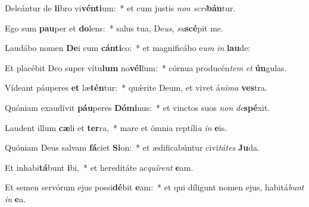 \item Deleántur de \textbf{li}bro vi\textbf{vén}\textbf{ti}um:~* et cum justis \textit{non} \textit{scri}\textbf{bán}tur.
\item Ego sum \textbf{pau}per et \textbf{do}lens:~* salus tua, De\textit{us}, \textit{su}\textbf{scé}pit me.
\item Laudábo nomen \textbf{De}i cum \textbf{cán}\textbf{ti}co:~* et magnificábo e\textit{um} \textit{in} \textbf{lau}de:
\item Et placébit Deo super vítu\textbf{lum} no\textbf{vél}lum:~* córnua producén\textit{tem} \textit{et} \textbf{ún}gulas.
\item Vídeant páuperes \textbf{et} læ\textbf{tén}tur:~* quǽrite Deum, et vivet á\textit{ni}\textit{ma} \textbf{ves}tra.
\item Quóniam exaudívit \textbf{páu}peres \textbf{Dó}\textbf{mi}nus:~* et vinctos suos \textit{non} \textit{de}\textbf{spé}xit.
\item Laudent illum \textbf{cæ}li et \textbf{ter}ra,~* mare et ómnia reptíli\textit{a} \textit{in} \textbf{e}is.
\item Quóniam Deus salvam \textbf{fá}ciet \textbf{Si}on:~* et ædificabúntur civi\textit{tá}\textit{tes} \textbf{Ju}da.
\item Et inhabi\textbf{tá}bunt \textbf{i}bi,~* et hereditáte ac\textit{quí}\textit{rent} \textbf{e}am.
\item Et semen servórum ejus possi\textbf{dé}bit \textbf{e}am:~* et qui díligunt nomen ejus, habitá\textit{bunt} \textit{in} \textbf{e}a.
